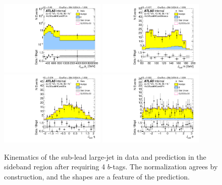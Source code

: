\begin{figure}[htbp!]
\begin{center}
\includegraphics[width=0.45\textwidth,angle=-90]{figures/boosted/Sideband/b77_FourTag_Sideband_sublHCand_Pt_m_1.pdf}
\includegraphics[width=0.45\textwidth,angle=-90]{figures/boosted/Sideband/b77_FourTag_Sideband_sublHCand_Mass_s.pdf}\\
\includegraphics[width=0.45\textwidth,angle=-90]{figures/boosted/Sideband/b77_FourTag_Sideband_sublHCand_Eta.pdf}
\includegraphics[width=0.45\textwidth,angle=-90]{figures/boosted/Sideband/b77_FourTag_Sideband_sublHCand_Phi.pdf}
  \caption{Kinematics of the sub-lead large-\R jet in data and prediction in the sideband region after requiring 4 $b$-tags. The normalization agrees by construction, and the shapes are a feature of the prediction.}
  \label{fig:boosted-4b-sideband-ak10-subl}
\end{center}
\end{figure}

